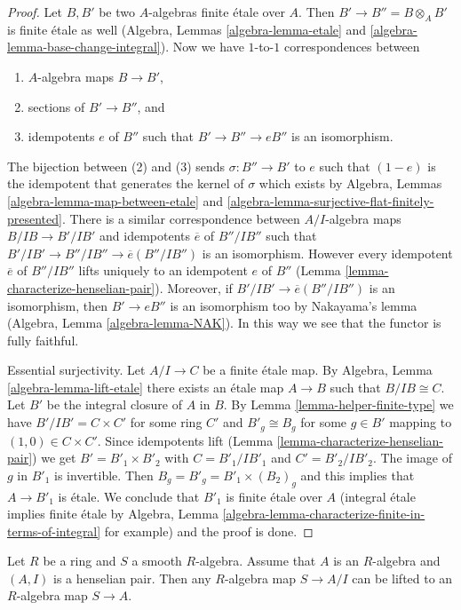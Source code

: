 \begin{proof}
Let $B, B'$ be two $A$-algebras finite \'etale over $A$.
Then $B' \to B'' = B \otimes_A B'$ is finite \'etale as well
(Algebra, Lemmas \ref{algebra-lemma-etale} and
\ref{algebra-lemma-base-change-integral}).
Now we have $1$-to-$1$ correspondences between
\begin{enumerate}
\item $A$-algebra maps $B \to B'$,
\item sections of $B' \to B''$, and
\item idempotents $e$ of $B''$ such that $B' \to B'' \to eB''$ is
an isomorphism.
\end{enumerate}
The bijection between (2) and (3) sends $\sigma : B'' \to B'$
to $e$ such that $(1 - e)$ is the idempotent
that generates the kernel of $\sigma$ which exists by
Algebra, Lemmas \ref{algebra-lemma-map-between-etale} and
\ref{algebra-lemma-surjective-flat-finitely-presented}.
There is a similar correspondence between
$A/I$-algebra maps $B/IB \to B'/IB'$ and idempotents
$\overline{e}$ of $B''/IB''$ such that
$B'/IB' \to B''/IB'' \to \overline{e}(B''/IB'')$ is
an isomorphism. However every idempotent $\overline{e}$ of $B''/IB''$
lifts uniquely to an idempotent $e$ of $B''$
(Lemma \ref{lemma-characterize-henselian-pair}).
Moreover, if $B'/IB' \to \overline{e}(B''/IB'')$ is an isomorphism,
then $B' \to eB''$ is an isomorphism too by Nakayama's lemma
(Algebra, Lemma \ref{algebra-lemma-NAK}).
In this way we see that the functor is fully faithful.

\medskip\noindent
Essential surjectivity. Let $A/I \to C$ be a finite \'etale map.
By Algebra, Lemma \ref{algebra-lemma-lift-etale}
there exists an \'etale map $A \to B$ such that $B/IB \cong C$.
Let $B'$ be the integral closure of $A$ in $B$. 
By Lemma \ref{lemma-helper-finite-type} we have
$B'/IB' = C \times C'$ for some ring $C'$
and $B'_g \cong B_g$ for some $g \in B'$ mapping to $(1, 0) \in C \times C'$.
Since idempotents lift
(Lemma \ref{lemma-characterize-henselian-pair})
we get $B' = B'_1 \times B'_2$ with $C = B'_1/IB'_1$ and $C' = B'_2/IB'_2$.
The image of $g$ in $B'_1$ is invertible.
Then $B_g = B'_g = B'_1 \times (B_2)_g$ and this implies
that $A \to B'_1$ is \'etale.
We conclude that $B'_1$ is finite \'etale over $A$
(integral \'etale implies finite \'etale by
Algebra, Lemma \ref{algebra-lemma-characterize-finite-in-terms-of-integral}
for example)
and the proof is done.
\end{proof}

\begin{lemma}
\label{lemma-lift-smooth-henselian}
Let $R$ be a ring and $S$ a smooth $R$-algebra. Assume that $A$
is an $R$-algebra and $(A,I)$ is a henselian pair. Then any $R$-algebra
map $S \to A/I$ can be lifted to an $R$-algebra map $S \to A$.
\end{lemma}

